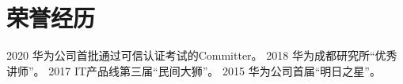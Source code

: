 \documentclass[]{resume}
\begin{document}
\section{荣誉经历}

\begin{twentyshort}
  \twentyitemshort
    {2020}
    {华为公司首批通过可信认证考试的Committer。}
  \twentyitemshort
    {2018}
    {华为成都研究所“优秀讲师”。}
  \twentyitemshort
    {2017}
    {IT产品线第三届“民间大狮”。}
  \twentyitemshort
    {2015}
    {华为公司首届“明日之星”。}
\end{twentyshort}

\end{document}
